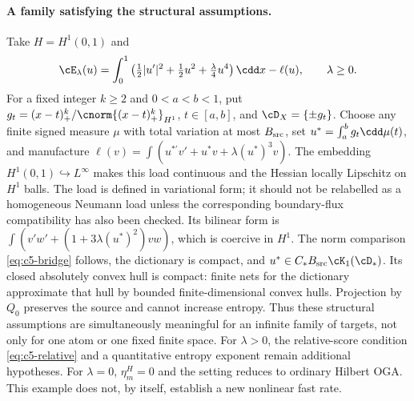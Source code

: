 \documentclass[11pt]{article}
\theoremstyle{remark}
\begin{document}
\paragraph{A family satisfying the structural assumptions.}
Take $H=H^1(0,1)$ and
\[
 \cE_\lambda(u)=\int_0^1
 \left(\tfrac12|u'|^2+\tfrac12u^2+\tfrac\lambda4u^4\right)\cdd x-\ell(u),
 \qquad\lambda\geq0 .
\]
For a fixed integer $k\geq2$ and $0<a<b<1$, put
$g_t=(x-t)_+^k/\cnorm{(x-t)_+^k}_{H^1}$, $t\in[a,b]$,
and $\cD_X=\{\pm g_t\}$.
Choose any finite signed measure $\mu$ with total variation at most
$B_{\rm src}$, set $u^*=\int_a^b g_t\cdd\mu(t)$, and manufacture
$\ell(v)=\int(u^{*\prime}v'+u^*v+\lambda(u^*)^3v)$.
The embedding $H^1(0,1)\hookrightarrow L^\infty$ makes this load
continuous and the Hessian locally Lipschitz on $H^1$ balls.  The load is
defined in variational form; it should not be relabelled as a homogeneous
Neumann load unless the corresponding boundary-flux compatibility has also
been checked.
Its bilinear form is
$\int(v'w'+(1+3\lambda(u^*)^2)vw)$, which is coercive in $H^1$.
The norm comparison \eqref{eq:c5-bridge} follows, the dictionary is compact,
and $u^*\in C_*B_{\rm src}\cK_1(\cD_*)$.
Its closed absolutely convex hull is compact: finite nets for the
dictionary approximate that hull by bounded finite-dimensional convex hulls.
Projection by $Q_0$ preserves the source and cannot increase entropy.
Thus these structural assumptions are simultaneously meaningful for an
infinite family of targets, not only for one atom or one fixed finite space.
For $\lambda>0$, the relative-score condition
\eqref{eq:c5-relative} and a quantitative entropy exponent remain additional
hypotheses. For $\lambda=0$, $\eta_m^H=0$ and the setting reduces to
ordinary Hilbert OGA. This example does not, by itself, establish a new
nonlinear fast rate.
\end{document}
